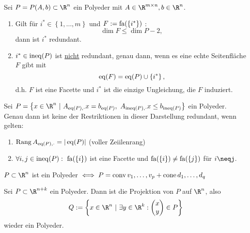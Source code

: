 \begin{lemma}
	Sei $P = P(A,b) \subset \R^n$ ein Polyeder mit $A\in \R^{m \times n}, b \in \R^n$.
	\begin{enumerate}[label = (\alph*)]
		\item Gilt für $i^* \in \left\{1,\dots ,m \right\}$ und $F:=\operatorname{fa}(\left\{i^* \right\})$ :
			\begin{equation*}
				\dim F \leq \dim P - 2,
			\end{equation*}
			dann ist $i^*$ redundant.	
		\item $i^* \in \operatorname{ineq}(P)$ ist \underline{nicht} redundant, genau dann, wenn es eine echte Seitenfläche $F$ gibt mit 
			\begin{equation*}
				\operatorname{eq}(F)= \operatorname{eq}(P)\cup \left\{i^* \right\},
			\end{equation*}
			d.h. $F$ ist eine Facette und $i^*$ ist die einzige Ungleichung, die $F$ induziert.
	\end{enumerate}
\end{lemma}
\begin{satz}
	Sei $P = \left\{ x \in \R^n\ |\ A_{\eq(P),\cdot}x = b_{\eq(P)},\ A_{\ineq(P),\cdot}x \leq b_{\ineq(P)}  \right\}$ ein Polyeder.
	Genau dann ist keine der Restriktionen in dieser Darstellung redundant, wenn gelten:
	\begin{enumerate}[label = \alph*.)]
		\item $\operatorname{Rang} A_{\operatorname{eq}(P),\cdot}= |\operatorname{eq}(P)|$ (voller Zeiilenrang)
		\item $\forall i,j \in \ineq(P):\ \fa(\left\{i \right\})$ ist eine Facette und $\operatorname{fa}(\left\{i \right\}) \neq \operatorname{fa}(\left\{j \right\})$ für $i\neqj$.
	\end{enumerate}
\end{satz}
$P \subset \R^n$ ist ein Polyeder $\iff P=\operatorname{conv}{v_{1},\dots ,v_{p}} + \operatorname{cone}{d_{1},\dots ,d_{q}}$
\begin{satz}
	Sei $P \subset \R^{n+k}$ ein Polyeder. 
	Dann ist  die Projektion von $P$ auf $\R^n$, also 
	\begin{equation*}
		Q:= \left\{ x \in \R^n\ |\ \exists y\in \R^k: 
			\begin{pmatrix}
				x\\y
			\end{pmatrix}
			\in P
		 \right\}
	\end{equation*}
	wieder ein Polyeder.	
\end{satz}
